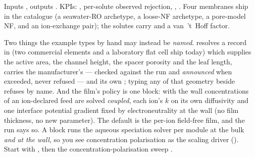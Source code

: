 \documentclass[11pt,a4paper]{article}
\begin{document}
Inputs , outputs .  KPIs:
, per-solute observed rejection, ,
.  Four membranes ship in the catalogue (a seawater-RO
archetype, a loose-NF archetype, a pore-model NF, and an ion-exchange
pair); the solutes carry  and a van~'t~Hoff
 factor.

Two things the example types by hand may instead be \emph{named}.
 resolves a  record
in  (two commercial elements and a
laboratory flat cell ship today) which supplies the active area, the
channel height, the spacer porosity and the leaf length, carries the
manufacturer's  --- checked against the run and
\emph{announced} when exceeded, never refused --- and its own
; typing any of that geometry beside 
refuses by name.  And the film's policy is one  block: with
 the wall concentrations of an
ion-declared feed are solved \emph{coupled}, each ion's $k$ on its own
diffusivity and one interface potential gradient fixed by
electroneutrality at the wall (no film thickness, no new parameter).
The default is the per-ion field-free film, and the run says so.  A  block runs the aqueous speciation solver per module at the
bulk \emph{and at the wall}, so you see concentration polarisation as
the scaling driver ().  Start with
, then the concentration-polarisation
sweep .
\end{document}
